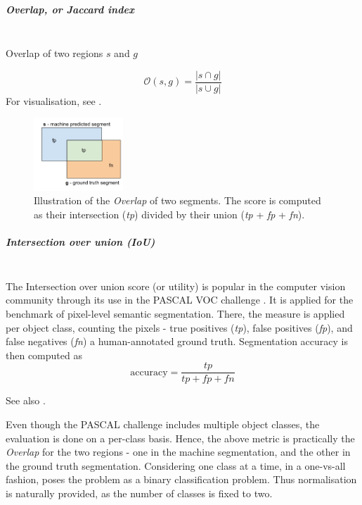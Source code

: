 \subparagraph{Overlap, or Jaccard index}\mbox{}\\
Overlap of two regions %
$s$ and $g$

\begin{equation}
\mathcal{O}\left(s,g\right)=\frac{\left|s\cap g\right|}{\left|s\cup g\right|}
\end{equation}
For visualisation, see .

\begin{figure}[t]
\centering
\includegraphics[width=0.3\textwidth]{images/scoring_fcns/intersection-over-union_score_illustrated.png}
\caption[Illustration of the \textit{Overlap} of two segments]{Illustration of the \textit{Overlap} of two segments. The score is computed as their intersection (\textit{tp}) divided by their union (\textit{tp} + \textit{fp} + \textit{fn}).}
\label{fig:overlap-IoU}
\end{figure}

\subparagraph{Intersection over union (IoU)}\mbox{}\\
The Intersection over union score (or utility) %
is popular in the computer vision community through its use in the PASCAL VOC challenge \cite{PASCAL-voc-2012}. It is applied for the benchmark of pixel-level semantic segmentation. There, the measure is applied per object class, counting the pixels - true positives (\textit{tp}), false positives (\textit{fp}), and false negatives (\textit{fn}) \wrt a human-annotated ground truth. Segmentation accuracy is then computed as
\begin{equation}
 \text{accuracy} = \frac{\textit{tp}}{\textit{tp} + \textit{fp} + \textit{fn}}
\end{equation}

See also .

Even though the PASCAL challenge includes multiple object classes, the evaluation is done on a per-class basis. Hence, the above metric is practically the {\it Overlap} for the two regions - one in the machine segmentation, and the other in the ground truth segmentation. %
Considering one class at a time, in a one-vs-all fashion, poses the problem as a binary classification problem. Thus normalisation is naturally provided, as the number of classes is fixed to two. %

